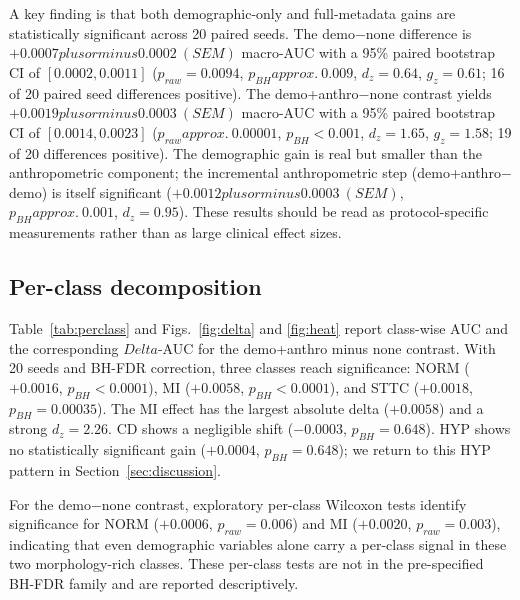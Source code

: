 \documentclass[mathematics,article,pdftex]{Definitions/mdpi}
\def\texttt#1{#1}%
\def\mathrm#1{#1}%
\def\textbf#1{#1}%
\def\Delta{Delta }%
\def\pm{plus or minus }%
\def\approx{approx.\ }%
\begin{document}
A key finding is that \textbf{both demographic-only and full-metadata gains are statistically significant} across 20 paired seeds. The \texttt{demo}$-$\texttt{none} difference is $+0.0007 \pm 0.0002\ (\mathrm{SEM})$ macro-AUC with a 95\% paired bootstrap CI of $[0.0002, 0.0011]$ ($p_{\mathrm{raw}}{=}0.0094$, $p_{\mathrm{BH}}{\approx}0.009$, $d_{\mathrm{z}}{=}0.64$, $g_{\mathrm{z}}{=}0.61$; 16 of 20 paired seed differences positive). The \texttt{demo+anthro}$-$\texttt{none} contrast yields $+0.0019 \pm 0.0003\ (\mathrm{SEM})$ macro-AUC with a 95\% paired bootstrap CI of $[0.0014, 0.0023]$ ($p_{\mathrm{raw}}{\approx}0.00001$, $p_{\mathrm{BH}}{<}0.001$, $d_{\mathrm{z}}{=}1.65$, $g_{\mathrm{z}}{=}1.58$; 19 of 20 differences positive). The demographic gain is real but smaller than the anthropometric component; the incremental anthropometric step (\texttt{demo+anthro}$-$\texttt{demo}) is itself significant ($+0.0012 \pm 0.0003\ (\mathrm{SEM})$, $p_{\mathrm{BH}}{\approx}0.001$, $d_{\mathrm{z}}{=}0.95$). These results should be read as protocol-specific measurements rather than as large clinical effect sizes.

\subsection{Per-class decomposition}
Table~\ref{tab:perclass} and Figs.~\ref{fig:delta} and \ref{fig:heat} report class-wise AUC and the corresponding $\Delta$-AUC for the \texttt{demo+anthro} minus \texttt{none} contrast. With 20 seeds and BH-FDR correction, \textbf{three classes reach significance}: \textbf{NORM} ($+0.0016$, $p_{\mathrm{BH}}{<}0.0001$), \textbf{MI} ($+0.0058$, $p_{\mathrm{BH}}{<}0.0001$), and \textbf{STTC} ($+0.0018$, $p_{\mathrm{BH}}{=}0.00035$). The MI effect has the largest absolute delta ($+0.0058$) and a strong $d_{\mathrm{z}}{=}2.26$. CD shows a negligible shift ($-0.0003$, $p_{\mathrm{BH}}{=}0.648$). \textbf{HYP shows no statistically significant gain} ($+0.0004$, $p_{\mathrm{BH}}{=}0.648$); we return to this HYP pattern in Section~\ref{sec:discussion}.

For the \texttt{demo}$-$\texttt{none} contrast, exploratory per-class Wilcoxon tests identify significance for NORM ($+0.0006$, $p_{\mathrm{raw}}{=}0.006$) and MI ($+0.0020$, $p_{\mathrm{raw}}{=}0.003$), indicating that even demographic variables alone carry a per-class signal in these two morphology-rich classes. These per-class tests are not in the pre-specified BH-FDR family and are reported descriptively.
\end{document}
